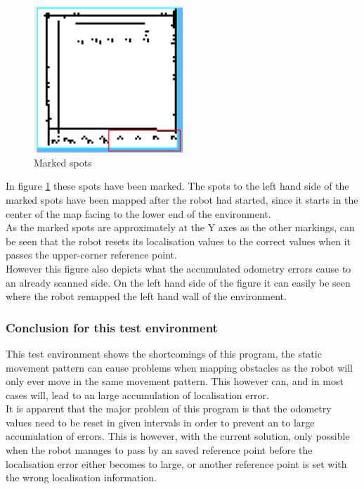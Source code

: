 \begin{figure}[h]
\centering
\includegraphics[width = 0.5\textwidth]{../../figures/map_results/dotted_odometry_error.png}
\caption{Marked spots}
\label{dotted_odomery_error}
\end{figure}

In figure \ref{dotted_odomery_error} these spots have been marked. The spots to the left hand side of the marked spots have been mapped after the robot had started, since it starts in the center of the map facing to the lower end of the environment. \\
As the marked spots are approximately at the Y axes as the other markings, can be seen that the robot resets its localisation values to the correct values when it passes the upper-corner reference point. \\
However this figure also depicts what the accumulated odometry errors cause to an already scanned side. On the left hand side of the figure it can easily be seen where the robot remapped the left hand wall of the environment.\\

\subsubsection{Conclusion for this test environment}
This test environment shows the shortcomings of this program, the static movement pattern can cause problems when mapping obstacles as the robot will only ever move in the same movement pattern. This however can, and in most cases will, lead to an large accumulation of localisation error.\\
It is apparent that the major problem of this program is that the odometry values need to be reset in given intervals in order to prevent an to large accumulation of errors. This is however, with the current solution, only possible when the robot manages to pass by an saved reference point before the localisation error either becomes to large, or another reference point is set with the wrong localisation information.\\[3ex]

